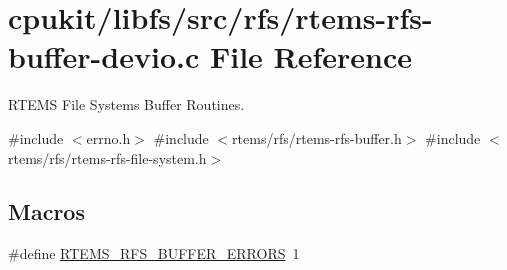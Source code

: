 \hypertarget{rtems-rfs-buffer-devio_8c}{}\section{cpukit/libfs/src/rfs/rtems-\/rfs-\/buffer-\/devio.c File Reference}
\label{rtems-rfs-buffer-devio_8c}


R\+T\+E\+MS File Systems Buffer Routines.  


{\ttfamily \#include $<$errno.\+h$>$}\newline
{\ttfamily \#include $<$rtems/rfs/rtems-\/rfs-\/buffer.\+h$>$}\newline
{\ttfamily \#include $<$rtems/rfs/rtems-\/rfs-\/file-\/system.\+h$>$}\newline
\subsection*{Macros}
\begin{DoxyCompactItemize}
\item 
\#define \mbox{\hyperlink{rtems-rfs-buffer-devio_8c_aac9dd129acbb51881614ffe77ed3e55e}{R\+T\+E\+M\+S\+\_\+\+R\+F\+S\+\_\+\+B\+U\+F\+F\+E\+R\+\_\+\+E\+R\+R\+O\+RS}}~1
\end{DoxyCompactItemize}
